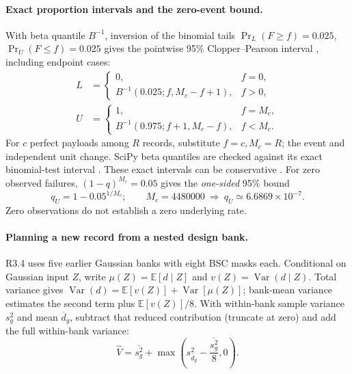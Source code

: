 \paragraph{Exact proportion intervals and the zero-event bound.}
With beta quantile $B^{-1}$, inversion of the binomial tails
$\Pr_L(F\ge f)=0.025$, $\Pr_U(F\le f)=0.025$ gives the pointwise 95\%
Clopper--Pearson interval \citep{clopper1934limits}, including endpoint cases:
\begin{align}
 L&=\begin{cases}0,&f=0,\\
 B^{-1}(0.025;f,M_c-f+1),&f>0,\end{cases}\\
 U&=\begin{cases}1,&f=M_c,\\
 B^{-1}(0.975;f+1,M_c-f),&f<M_c.\end{cases}
 \label{eq:r33-cp}
\end{align}
For $c$ perfect payloads among $R$ records, substitute $f=c,M_c=R$;
the event and independent unit change. SciPy beta quantiles are checked
against its exact binomial-test interval \citep{scipy1153binomialci}.
These exact intervals can be conservative \citep{thulin2014cost}.
For zero observed failures, $(1-q)^{M_c}=0.05$ gives the
\emph{one-sided} 95\% bound
\begin{equation}
 q_U=1-0.05^{1/M_c};
 \qquad M_c=4480000\ \Longrightarrow\
 q_U\simeq6.6869\times10^{-7}.
 \label{eq:r33-zero}
\end{equation}
Zero observations do not establish a zero underlying rate.

\paragraph{Planning a new record from a nested design bank.}
R3.4 uses five earlier Gaussian banks with eight BSC masks each.
Conditional on Gaussian input $Z$, write $\mu(Z)=\mathbb E[d\mid Z]$ and
$v(Z)=\operatorname{Var}(d\mid Z)$. Total variance gives
$\operatorname{Var}(d)=\mathbb E[v(Z)]+\operatorname{Var}[\mu(Z)]$;
bank-mean variance estimates the second term plus $\mathbb E[v(Z)]/8$.
With within-bank sample variance $s_g^2$ and mean $\overline d_g$, subtract
that reduced contribution (truncate at zero) and add the full within-bank variance:
\begin{equation}
 \widehat V=
 \overline{s_g^2}+
 \max\!\left(s_{\overline d_g}^2-\frac{\overline{s_g^2}}8,0\right).
 \label{eq:r34-planning}
\end{equation}

